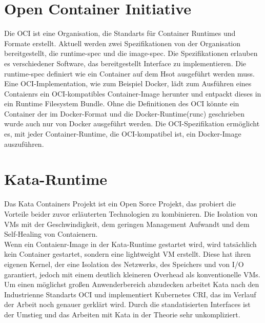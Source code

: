 \section{Open Container Initiative}
Die \ac{OCI} ist eine Organisation, die Standarts für Container Runtimes und Formate erstellt.
Aktuell werden zwei Spezifikationen von der Organisation bereitgestellt, die \ac{runtime-spec} und die \ac{image-spec}.
Die Spezifikationen erlauben es verschiedener Software, das bereitgestellt Interface zu implementieren.
Die \ac{runtime-spec} definiert wie ein Container auf dem Hsot ausgeführt werden muss. 
Eine \ac{OCI}-Implementation, wie zum Beispiel Docker, lädt zum Ausführen eines Contaienrs ein \ac{OCI}-kompatibles Container-Image herunter und entpackt dieses in ein Runtime Filesystem Bundle.
Ohne die Definitionen des \ac{OCI} könnte ein Container der im Docker-Format und die Docker-Runtime(runc) geschrieben wurde auch nur von Docker ausgeführt werden.
Die \ac{OCI}-Spezifikation ermöglicht es, mit jeder Container-Runtime, die \ac{OCI}-kompatibel ist, ein Docker-Image auszuführen. \cite{oci}



\section{Kata-Runtime}
Das Kata Containers Projekt ist ein Open Sorce Projekt, das probiert die Vorteile beider zuvor erläuterten Technologien zu kombinieren.
Die Isolation von \ac{VM}s mit der Geschwindigkeit, dem geringen Management Aufwandt und dem Self-Healing von Contaienern.
\\
Wenn ein Contaienr-Image in der Kata-Runtime gestartet wird, wird tatsächlich kein Container gestartet, sondern eine lightweight \ac{VM} erstellt.
Diese hat ihren eigenen Kernel, der eine Isolation des Netzwerks, des Speichers und von \ac{I/O} garantiert, jedoch mit einem deutlich kleineren Overhead als konventionelle \ac{VM}s.
Um einen möglichst großen Anwenderbereich abzudecken arbeitet Kata nach den Industrienne Standarts \ac{OCI} und implementiert Kubernetes \ac{CRI}, das im Verlauf der Arbeit noch genauer gerklärt wird. 
Durch die standatisierten Interfaces ist der Umstieg und das Arbeiten mit Kata in der Theorie sehr unkompliziert. \cite{kata}

